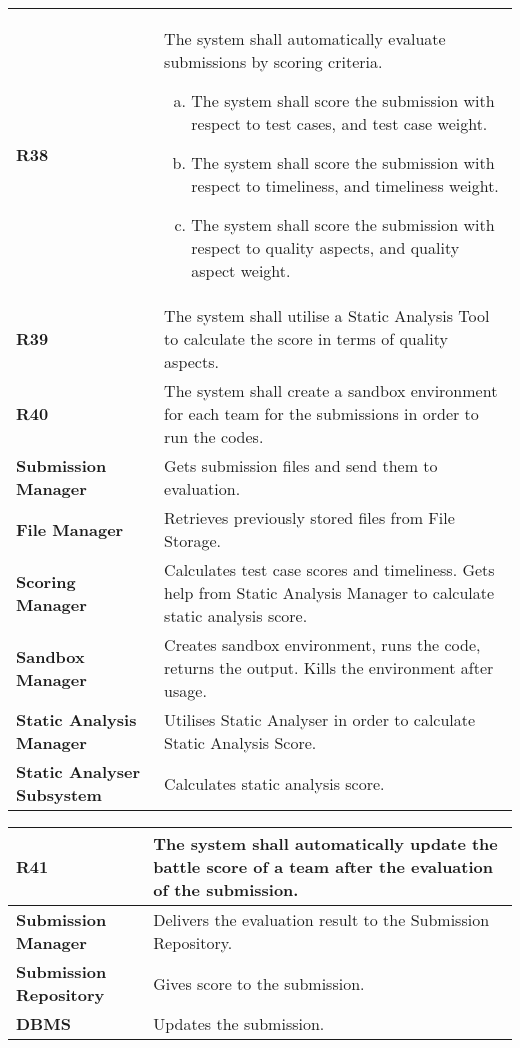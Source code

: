 \begin{table}[h!]
  \centering
  \begin{tabular}{lp{12cm}}
    \hline
    \textbf{R38} & The system shall automatically evaluate submissions by scoring criteria.
     \begin{enumerate}[(a)]
         \item The system shall score the submission with respect to test cases, and test case weight.
         \item The system shall score the submission with respect to timeliness, and timeliness weight.
         \item The system shall score the submission with respect to quality aspects, and quality aspect weight.
     \end{enumerate}
\\
 \textbf{R39} & The system shall utilise a Static Analysis Tool to calculate the score in terms of quality aspects.\\
 \textbf{R40} & The system shall create a sandbox environment for each team for the submissions in order to run the codes.\\
    \hline
    \hline
    \textbf{Submission Manager} & Gets submission files and send them to evaluation. \\
    \textbf{File Manager} & Retrieves previously stored files from File Storage.\\
    \textbf{Scoring Manager} &  Calculates test case scores and timeliness. Gets help from Static Analysis Manager to calculate static analysis score.\\
    \textbf{Sandbox Manager} & Creates sandbox environment, runs the code, returns the output. Kills the environment after usage.\\
    \textbf{Static Analysis Manager} & Utilises Static Analyser in order to calculate Static Analysis Score. \\
    \textbf{Static Analyser Subsystem} & Calculates static analysis score.\\
    \hline
  \end{tabular}
\end{table}

\begin{table}[h!]
  \centering
  \begin{tabular}{lp{12cm}}
    \hline
    \textbf{R41} &  The system shall automatically update the battle score of a team after the evaluation of the submission. \\
    \hline
    \hline
    \textbf{Submission Manager} & Delivers the evaluation result to the Submission Repository. \\
    \textbf{Submission Repository} & Gives score to the submission.\\
    \textbf{DBMS} & Updates the submission.\\
    \hline
  \end{tabular}
\end{table}


